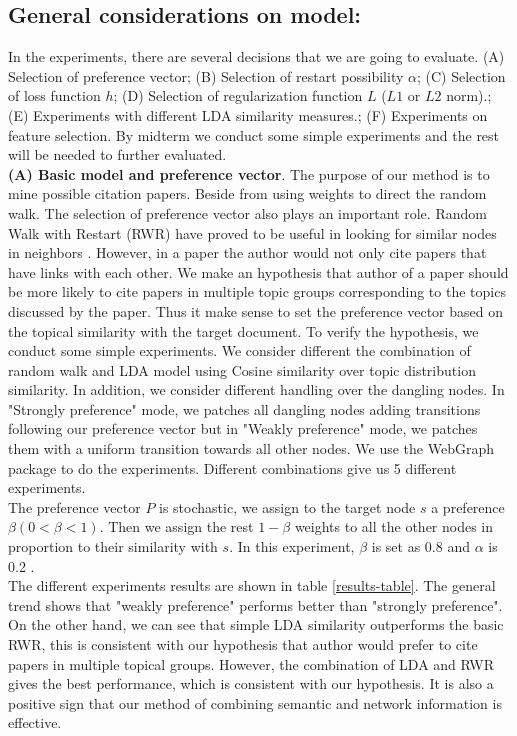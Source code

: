 \documentclass{article} %
\begin{document}
\subsection{General considerations on model:} 
In the experiments, there are several decisions that we are going to evaluate. (A) Selection of preference vector; (B) Selection of restart possibility $\alpha$; (C) Selection of loss function $h$;  (D) Selection of regularization function $L$ ($L1$ or $L2$ norm).; (E) Experiments with different LDA similarity measures.; (F) Experiments on feature selection. By midterm we conduct some simple experiments and the rest will be needed to further evaluated.\\
\textbf{(A) Basic model and preference vector}. 
The purpose of our method is to mine possible citation papers. Beside from using weights to direct the random walk. The selection of preference vector also plays an important role. Random Walk with Restart (RWR) have proved to be useful in looking for similar nodes in neighbors  \cite{Backstrom:2011:SRW:1935826.1935914,Tong2006}. However, in a paper the author would not only cite papers that have links with each other. We make an hypothesis that author of a paper should be more likely to cite papers in multiple topic groups corresponding to the topics discussed by the paper. Thus it make sense to set the preference vector based on the topical similarity with the target document. To verify the hypothesis, we conduct some simple experiments. We consider different the combination of random walk and LDA model using Cosine similarity over topic distribution similarity. In addition, we consider different handling over the dangling nodes. In "Strongly preference" mode, we patches all dangling nodes adding transitions following our preference vector but in "Weakly preference" mode, we patches them with a uniform transition towards all other nodes. We use the WebGraph\cite{Boldi2004} package to do the experiments. Different combinations give us 5 different experiments.\\
The preference vector $P$ is stochastic, we assign to the target node $s$ a preference $\beta (0< \beta <1)$. Then we assign the rest $1-\beta$ weights to all the other nodes in proportion to their similarity with $s$. In this experiment, $\beta$ is set as 0.8 and $\alpha$ is 0.2 .\\
The different experiments results are shown in table \ref{results-table}. The general trend shows that "weakly preference" performs better than "strongly preference". On the other hand, we can see that simple LDA similarity outperforms the basic RWR, this is consistent with our hypothesis that author would prefer to cite papers in multiple topical groups. However, the combination of LDA and RWR gives the best performance, which is consistent with our hypothesis. It is also a positive sign that our method of combining semantic and network information is effective. \\
\end{document}
